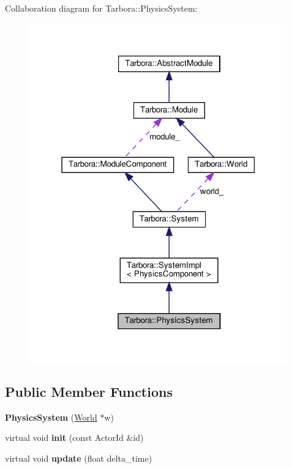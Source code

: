 Collaboration diagram for Tarbora\+:\+:Physics\+System\+:
\nopagebreak
\begin{figure}[H]
\begin{center}
\leavevmode
\includegraphics[width=316pt]{classTarbora_1_1PhysicsSystem__coll__graph}
\end{center}
\end{figure}
\subsection*{Public Member Functions}
\begin{DoxyCompactItemize}
\item 
\mbox{\label{classTarbora_1_1PhysicsSystem_adcffe4eadcb8ea852099ebb661075ec2}} 
{\bfseries Physics\+System} (\hyperlink{classTarbora_1_1World}{World} $\ast$w)
\item 
\mbox{\label{classTarbora_1_1PhysicsSystem_a1b5ac1c67c926fca91b2d84b5b61c226}} 
virtual void {\bfseries init} (const Actor\+Id \&id)
\item 
\mbox{\label{classTarbora_1_1PhysicsSystem_a218a82658b50a4282fd0cfd38397a9ed}} 
virtual void {\bfseries update} (float delta\+\_\+time)
\end{DoxyCompactItemize}
